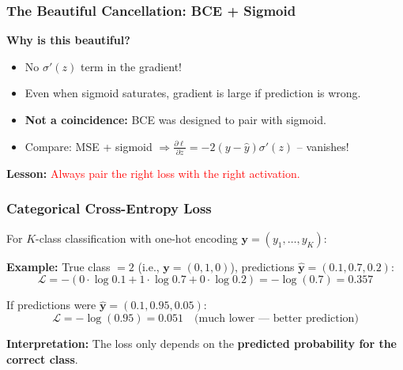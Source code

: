 \documentclass[notes,11pt, aspectratio=169]{beamer}
\newcommand{\vy}{\mathbf{y}}
\newcommand{\pd}[2]{\frac{\partial #1}{\partial #2}}
\begin{document}
\begin{frame}
\frametitle{The Beautiful Cancellation: BCE + Sigmoid}


\vspace{6pt}
\textbf{Why is this beautiful?}
\begin{itemize}
    \item No $\sigma'(z)$ term in the gradient!
    \item Even when sigmoid saturates, gradient is large if prediction is wrong.
    \item \textbf{Not a coincidence:} BCE was designed to pair with sigmoid.
    \item Compare: MSE + sigmoid $\Rightarrow \pd{\ell}{z} = -2(y - \hat{y})\sigma'(z)$ -- vanishes!
\end{itemize}

\textbf{Lesson:} \textcolor{red}{Always pair the right loss with the right activation.}
\end{frame}

\begin{frame}
\frametitle{Categorical Cross-Entropy Loss}

For $K$-class classification with one-hot encoding $\vy = (y_1, \ldots, y_K)$:


\vspace{6pt}
\textbf{Example:} True class $= 2$ (i.e., $\vy = (0, 1, 0)$), predictions $\hat{\vy} = (0.1, 0.7, 0.2)$:
\[
    \mathcal{L} = -(0 \cdot \log 0.1 + 1 \cdot \log 0.7 + 0 \cdot \log 0.2) = -\log(0.7) = 0.357
\]

\vspace{4pt}
If predictions were $\hat{\vy} = (0.1, 0.95, 0.05)$:
\[
    \mathcal{L} = -\log(0.95) = 0.051 \quad \text{(much lower --- better prediction)}
\]

\vspace{6pt}
\textbf{Interpretation:} The loss only depends on the \textbf{predicted probability for the correct class}.
\end{frame}
\end{document}
